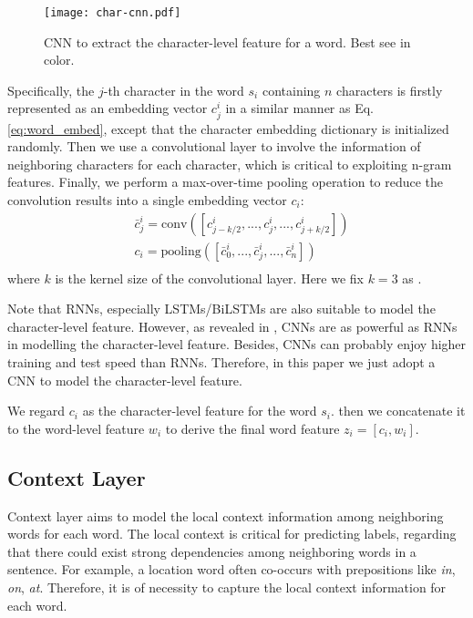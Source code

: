 \documentclass[letterpaper]{article} \usepackage{aaai19}  \usepackage{times}  \usepackage{helvet}  \usepackage{courier}  \usepackage{url}  \usepackage{graphicx}  \usepackage{amsmath}
\begin{document}
\begin{figure}[!t] \centering
  \texttt{[image: char-cnn.pdf]}
  \caption{CNN to extract the character-level feature for a word. Best see in color.}
  \label{fig:char-cnn}
\end{figure}

Specifically, the $j$-th character in the word $s_i$ containing $n$ characters is firstly represented as an embedding vector $c^i_j$ in a similar manner as Eq. \ref{eq:word_embed}, except that the character embedding dictionary is initialized randomly. Then we use a convolutional layer to involve the information of neighboring characters for each character, which is critical to exploiting n-gram features. Finally, we perform a max-over-time pooling operation to reduce the convolution results into a single embedding vector $c_i$:
\begin{equation}
\label{eq:char_cnn}
\begin{aligned}
&\bar{c}^i_j = \text{conv}([c^i_{j-k/2},...,c^i_j,...,c^i_{j+k/2}])\\
& c_i = \text{pooling}([\bar{c}^i_0,...,\bar{c}^i_j,...,\bar{c}^i_n])\\
\end{aligned}
\end{equation}
where $k$ is the kernel size of the convolutional layer. Here we fix $k=3$ as \cite{Ye2018HSCRF}.

Note that RNNs, especially LSTMs/BiLSTMs are also suitable to model the character-level feature. However, as revealed in \cite{yang2018design}, CNNs are as powerful as RNNs in modelling the character-level feature. Besides, CNNs can probably enjoy higher training and test speed than RNNs. Therefore, in this paper we just adopt a CNN to model the character-level feature.

We regard $c_i$ as the character-level feature for the word $s_i$. then we concatenate it to the word-level feature $w_i$ to derive the final word feature $z_i=[c_i,w_i]$.

\subsection{Context Layer}
Context layer aims to model the local context information among neighboring words for each word. The local context is critical for predicting labels, regarding that there could exist strong dependencies among neighboring words in a sentence. For example, a location word often co-occurs with prepositions like \textit{in}, \textit{on}, \textit{at}. Therefore, it is of necessity to capture the local context information for each word.
\end{document}
